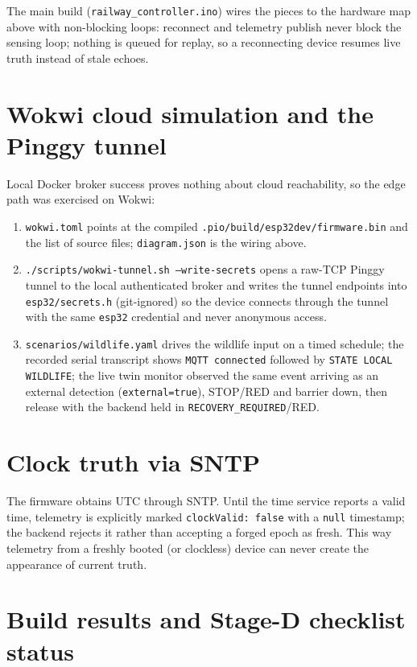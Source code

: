 The main build (\texttt{railway\_controller.ino}) wires the pieces to the
hardware map above with non-blocking loops: reconnect and telemetry
publish never block the sensing loop; nothing is queued for replay, so a
reconnecting device resumes live truth instead of stale echoes.

\section{Wokwi cloud simulation and the Pinggy tunnel}

Local Docker broker success proves nothing about cloud reachability, so
the edge path was exercised on Wokwi:

\begin{enumerate}
  \item \texttt{wokwi.toml} points at the compiled
        \texttt{.pio/build/esp32dev/firmware.bin} and the list of source
        files; \texttt{diagram.json} is the wiring above.
  \item \texttt{./scripts/wokwi-tunnel.sh --write-secrets} opens a raw-TCP
        Pinggy tunnel to the local authenticated broker and writes the
        tunnel endpoints into \texttt{esp32/secrets.h} (git-ignored) so
        the device connects through the tunnel with the same
        \texttt{esp32} credential and never anonymous access.
  \item \texttt{scenarios/wildlife.yaml} drives the wildlife input on a
        timed schedule; the recorded serial transcript shows
        \texttt{MQTT connected} followed by
        \texttt{STATE LOCAL WILDLIFE}; the live twin monitor observed the
        same event arriving as an external detection
        (\texttt{external=true}), STOP/RED and barrier down, then release
        with the backend held in \texttt{RECOVERY\_REQUIRED}/RED.
\end{enumerate}

\section{Clock truth via SNTP}

The firmware obtains UTC through SNTP. Until the time service reports a
valid time, telemetry is explicitly marked \texttt{clockValid: false}
with a \texttt{null} timestamp; the backend rejects it rather than
accepting a forged epoch as fresh. This way telemetry from a freshly
booted (or clockless) device can never create the appearance of current
truth.

\section{Build results and Stage-D checklist status}

